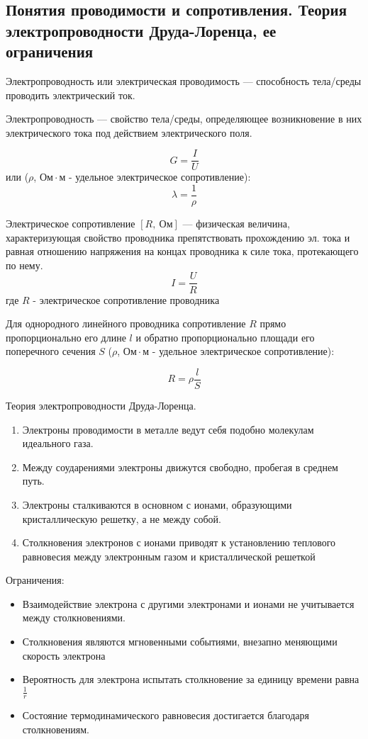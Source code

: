 \subsection{Понятия проводимости и сопротивления. Теория электропроводности Друда-Лоренца, ее ограничения}

\begin{definition}
    Электропроводность или электрическая проводимость — способность тела/среды проводить электрический ток.
\end{definition}

\begin{definition}
    Электропроводность — свойство тела/среды, определяющее возникновение в них электрического тока под действием электрического поля.

    $$
    G=\frac{I}{U}
    $$
    или ($\rho$, $Ом\cdot м$ - удельное электрическое сопротивление):
    $$
    \lambda=\frac{1}{\rho}
    $$
\end{definition}

\begin{definition}
    Электрическое сопротивление $[R,\ Ом]$ — физическая величина, характеризующая свойство проводника препятствовать прохождению эл. тока 
    и равная отношению напряжения на концах проводника к силе тока, протекающего по нему.
    $$
    I=\frac{U}{R}
    $$
    где $R$ - электрическое сопротивление проводника
\end{definition}

Для однородного линейного проводника сопротивление $R$ прямо пропорционально его длине $l$ и обратно пропорционально площади 
его поперечного сечения $S$ ($\rho$, $Ом\cdot м$ - удельное электрическое сопротивление):

$$
R=\rho\frac{l}{S}
$$

\begin{theorem}
Теория электропроводности Друда-Лоренца.
\begin{enumerate}
    \item Электроны проводимости в металле ведут себя подобно молекулам идеального газа.
    \item Между соударениями электроны движутся свободно, пробегая в среднем путь.
    \item Электроны сталкиваются в основном с ионами, образующими кристаллическую решетку, а не между собой.
    \item Столкновения электронов с ионами приводят к установлению теплового равновесия между электронным газом и кристаллической решеткой
\end{enumerate}

Ограничения:
\begin{itemize}
    \item Взаимодействие электрона с другими электронами и ионами не учитывается между столкновениями.
    \item Столкновения являются мгновенными событиями, внезапно меняющими скорость электрона
    \item Вероятность для электрона испытать столкновение за единицу времени равна $\frac{1}{r}$
    \item Состояние термодинамического равновесия достигается благодаря столкновениям.
\end{itemize}
\end{theorem}